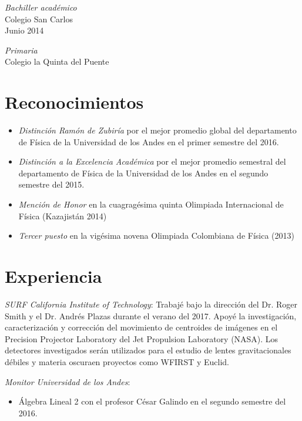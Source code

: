 \documentclass[line,margin]{res}
\begin{document}
\begin{resume}
{\sl Bachiller académico} \\
Colegio San Carlos \\
Junio 2014

{\sl Primaria} \\
Colegio la Quinta del Puente

\section{Reconocimientos}

\begin{itemize}

\item {\sl Distinción Ramón de Zubiría} por el mejor promedio global del departamento de Física de la Universidad de los Andes en el primer semestre del 2016.

\item {\sl Distinción a la Excelencia Académica} por el mejor promedio semestral del departamento de Física de la Universidad de los Andes en el segundo semestre del 2015.

\item {\sl Mención de Honor} en la cuagragésima quinta Olimpiada Internacional de Física (Kazajistán 2014)

\item {\sl Tercer puesto} en la vigésima novena Olimpiada Colombiana de Física (2013)

\end{itemize}

\section{Experiencia}

{\sl SURF California Institute of Technology}: Trabajé bajo la dirección del Dr. Roger Smith y el Dr. Andrés Plazas durante el verano del 2017. Apoyé la investigación, caracterización y corrección del movimiento de centroides de imágenes en el Precision Projector Laboratory del Jet Propulsion Laboratory (NASA). Los detectores investigados serán utilizados para el estudio de lentes gravitacionales débiles y materia oscuraen proyectos como WFIRST y Euclid.

{\sl Monitor Universidad de los Andes}: 
\begin{itemize}

\item Álgebra Lineal 2 con el profesor César Galindo en el segundo semestre del 2016.


\end{itemize}
\end{resume}
\end{document}
